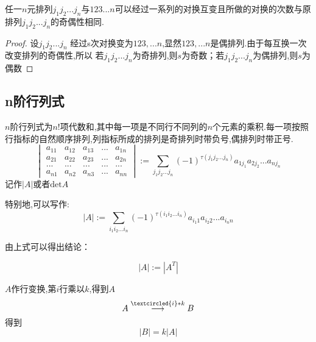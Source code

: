 \documentclass[blue,normal,cn]{elegantnote}
\begin{document}
\begin{theorem}
任一$n$元排列$j_1j_2...j_n$与$123...n$可以经过一系列的对换互变且所做的对换的次数与原排列$j_1j_2...j_n$的奇偶性相同.
\end{theorem}
\begin{proof}
设$j_1j_2...j_n$ 经过s次对换变为$123,...n$,显然$123,...n$是偶排列.由于每互换一次改变排列的奇偶性,所以
若$j_1j_2...j_n$为奇排列,则$s$为奇数；若$j_1j_2...j_n$为偶排列,则$s$为偶数
\end{proof}


\subsection{n阶行列式}

\begin{definition}[$n$阶行列式]
$n$阶行列式为$n!$项代数和,其中每一项是不同行不同列的$n$个元素的乘积.每一项按照行指标的自然顺序排列,列指标所成的排列是奇排列时带负号,偶排列时带正号.
\begin{equation*}
\begin{vmatrix} 
    a_{11}&a_{12} & a_{13} &...& a_{1n}\\
    a_{21}&a_{22} & a_{23} &...& a_{2n}\\
    ...&...&...&...&...\\
    a_{n1}&a_{n2} & a_{n3} &...& a_{nn}
\end{vmatrix}
:=\sum_{j_1j_2...j_n}(-1)^{\tau(j_1j_2...j_n)}a_{1j_1}a_{2j_2}...a_{nj_n}
\end{equation*}
记作$|A|$或者$\mathrm {det}A$
\end{definition}

特别地,可以写作:
\begin{equation*}
|A|:=\sum_{i_1i_2...i_n}(-1)^{\tau(i_1 i_2...i_n)}a_{i_1 1}a_{i_2 2}...a_{i_n n}
\end{equation*}

由上式可以得出结论：
\begin{property}
\begin{equation*}
    |A|:=|A^T|
\end{equation*}
\end{property}

\begin{property}
$A$作行变换,第$i$行乘以$k$,得到$A$
    \begin{equation*}
        A\stackrel{\textcircled{i}*k}{\longrightarrow}B
    \end{equation*}
得到
    \begin{equation*}
        |B|=k|A|
    \end{equation*}
\end{property}
\end{document}
